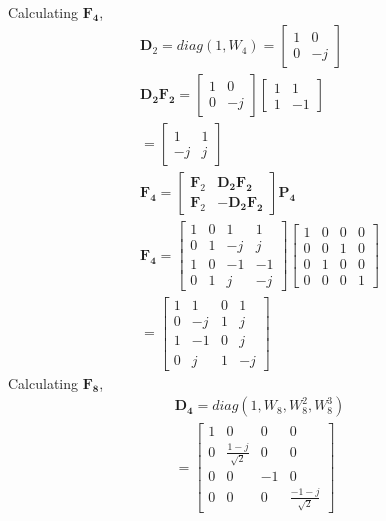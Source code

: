 \documentclass[journal,12pt,twocolumn]{IEEEtran}
\providecommand{\brak}[1]{\ensuremath{\left(#1\right)}}
\let\vec\mathbf
\numberwithin{equation}{section}
\renewcommand\thesection{\arabic{section}}
\begin{document}
\begin{enumerate}[label=\arabic*.,ref=\thesection.\theenumi]
\begin{align}
\end{align}
Calculating $\vec{F_4}$,
\begin{align}
\vec{D}_{2}=diag(1,W_4)
=\begin{bmatrix}
1&0\\0&-j
\end{bmatrix}\\
\vec{D_2F_2}=\begin{bmatrix}
1&0\\0&-j
\end{bmatrix}\begin{bmatrix}
1&1\\1&-1
\end{bmatrix}\\
=\begin{bmatrix}
1&1\\-j&j
\end{bmatrix}\\
\vec{F_4}=\begin{bmatrix}
\vec{F}_{2} & \vec{D_2F_2} \\
\vec{F}_{2} & -\vec{D_2F_2}
\end{bmatrix}\vec{P_4}\\
\vec{F_4}=\begin{bmatrix}
1&0&1&1\\0&1&-j&j\\1&0&-1&-1\\0&1&j&-j
\end{bmatrix}\begin{bmatrix}
1&0&0&0\\0&0&1&0\\0&1&0&0\\0&0&0&1
\end{bmatrix}\\
=\begin{bmatrix}
1&1&0&1\\0&-j&1&j\\1&-1&0&j\\0&j&1&-j
\end{bmatrix}
\end{align}
Calculating $\vec{F_8}$,
\begin{align}
\vec{D_4}=diag\brak{1,W_8,W_8^2,W_8^3}\\
=\begin{bmatrix}
1&0&0&0\\0&\frac{1-j}{\sqrt{2}}&0&0\\0&0&-1&0\\0&0&0&\frac{-1-j}{\sqrt{2}}
\end{bmatrix}\\

\end{align}
\end{enumerate}
\end{document}
